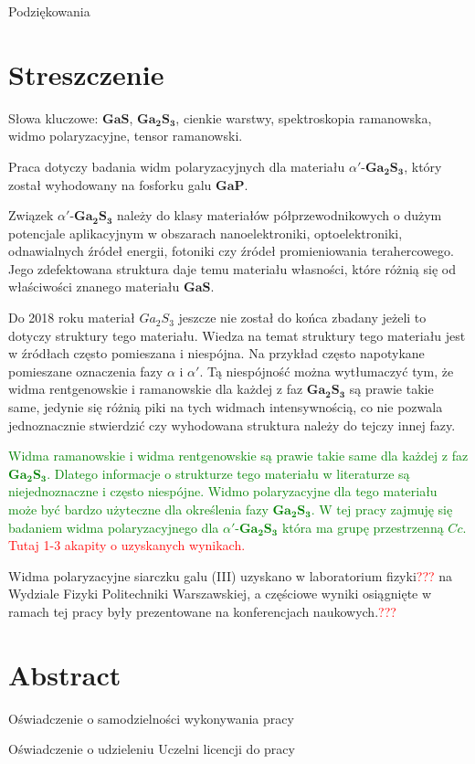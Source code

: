Podziękowania

\newpage

\section*{Streszczenie}

Słowa kluczowe: $\mathbf{GaS}$, $\mathbf{Ga_{2}S_{3}}$, cienkie warstwy, spektroskopia ramanowska, widmo polaryzacyjne, tensor ramanowski.

Praca dotyczy badania widm polaryzacyjnych dla materiału $\alpha'$-$\mathbf{Ga_{2}S_{3}}$, który został wyhodowany na fosforku galu $\mathbf{GaP}$. 

Związek $\alpha'$-$\mathbf{Ga_{2}S_{3}}$ należy do klasy materiałów półprzewodnikowych o dużym potencjale aplikacyjnym w obszarach nanoelektroniki, optoelektroniki, odnawialnych źródeł energii, fotoniki czy źródeł promieniowania terahercowego. Jego zdefektowana struktura daje temu materiału własności, które różnią się od właściwości znanego materiału $\mathbf{GaS}$.

Do 2018 roku materiał $Ga_{2}S_{3}$ jeszcze nie został do końca zbadany jeżeli to dotyczy struktury tego materiału. Wiedza na temat struktury tego materiału jest w źródłach często pomieszana i niespójna. Na przykład często napotykane pomieszane oznaczenia fazy $\alpha$ i $\alpha'$. Tą niespójność można wytłumaczyć tym, że widma rentgenowskie i ramanowskie dla każdej z faz $\mathbf{Ga_{2}S_{3}}$ są prawie takie same, jedynie się różnią piki na tych widmach intensywnością, co nie pozwala jednoznacznie stwierdzić czy wyhodowana struktura należy do tejczy innej fazy.

\textcolor{green}{Widma ramanowskie i widma rentgenowskie są prawie takie same dla każdej z faz $\mathbf{Ga_{2}S_{3}}$. Dlatego informacje o strukturze tego materiału w literaturze są niejednoznaczne i często niespójne. Widmo polaryzacyjne dla tego materiału może być bardzo użyteczne dla określenia fazy $\mathbf{Ga_{2}S_{3}}$. W tej pracy zajmuję się badaniem widma polaryzacyjnego dla $\alpha'$-$\mathbf{Ga_{2}S_{3}}$ która ma grupę przestrzenną $Cc$.}
\textcolor{red}{Tutaj 1-3 akapity o uzyskanych wynikach.}

Widma polaryzacyjne siarczku galu (III) uzyskano w laboratorium fizyki\textcolor{red}{???} na Wydziale Fizyki Politechniki Warszawskiej, a częściowe wyniki osiągnięte w ramach tej pracy były prezentowane na konferencjach naukowych.\textcolor{red}{???}  

\newpage

\section*{Abstract}

\newpage

Oświadczenie o samodzielności wykonywania pracy

\newpage

Oświadczenie o udzieleniu Uczelni licencji do pracy

\newpage